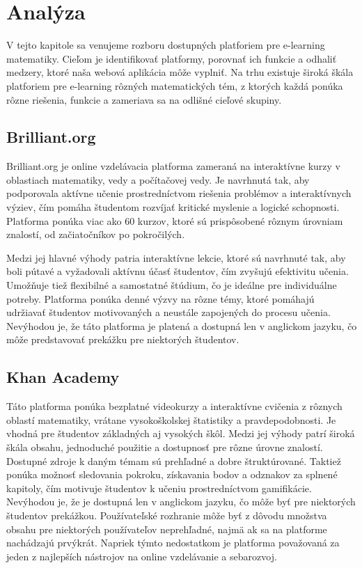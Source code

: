 \section{Analýza}
V tejto kapitole sa venujeme rozboru dostupných platforiem pre e-learning matematiky. 
Cieľom je identifikovať platformy, porovnať ich funkcie a odhaliť medzery, ktoré naša webová aplikácia môže vyplniť. 
Na trhu existuje široká škála platforiem pre e-learning rôzných matematických tém, 
z ktorých každá ponúka rôzne riešenia, funkcie a zameriava sa na odlišné cieľové skupiny.

\subsection{Brilliant.org}
Brilliant.org je online vzdelávacia platforma zameraná na interaktívne kurzy v oblastiach matematiky, vedy a počítačovej vedy.
Je navrhnutá tak, aby podporovala aktívne učenie prostredníctvom riešenia problémov a interaktívnych výziev, čím pomáha študentom rozvíjať kritické myslenie a logické schopnosti.
Platforma ponúka viac ako 60 kurzov, ktoré sú prispôsobené rôznym úrovniam znalostí, od začiatočníkov po pokročilých.

Medzi jej hlavné výhody patria interaktívne lekcie, ktoré sú navrhnuté tak, aby boli pútavé a vyžadovali aktívnu účasť študentov, čím zvyšujú efektivitu učenia.
Umožňuje tiež flexibilné a samostatné štúdium, čo je ideálne pre individuálne potreby. 
Platforma ponúka denné výzvy na rôzne témy, ktoré pomáhajú udržiavať študentov motivovaných a neustále zapojených do procesu učenia.
Nevýhodou je, že táto platforma je platená a dostupná len v anglickom jazyku, čo môže predstavovať prekážku pre niektorých študentov.
\cite{brilliant}
\subsection{Khan Academy}
Táto platforma ponúka bezplatné videokurzy a interaktívne cvičenia z rôznych oblastí matematiky, vrátane vysokoškolskej štatistiky a pravdepodobnosti.
Je vhodná pre študentov základných aj vysokých škôl. 
Medzi jej výhody patrí široká škála obsahu, jednoduché použitie a dostupnosť pre rôzne úrovne znalostí.
Dostupné zdroje k daným témam sú prehľadné a dobre štruktúrované.
Taktiež ponúka možnosť sledovania pokroku, získavania bodov a odznakov za splnené kapitoly, čím motivuje študentov k učeniu prostredníctvom gamifikácie.
Nevýhodou je, že je dostupná len v anglickom jazyku, čo môže byť pre niektorých študentov prekážkou. 
Používateľské rozhranie môže byť z dôvodu množstva obsahu pre niektorých používateľov neprehľadné, najmä ak sa na platforme nachádzajú prvýkrát. 
Napriek týmto nedostatkom je platforma považovaná za jeden z najlepších nástrojov na online vzdelávanie a sebarozvoj. \cite{khanacademy}
